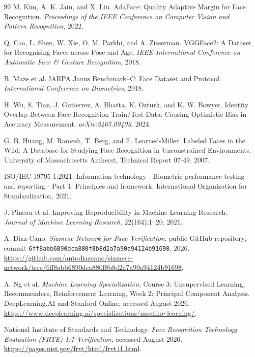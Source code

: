 \documentclass[10pt,a4paper]{article}
\newcommand{\code}[1]{\texttt{#1}}
\begin{document}
\begin{thebibliography}{99}
M. Kim, A. K. Jain, and X. Liu.
AdaFace: Quality Adaptive Margin for Face Recognition.
\emph{Proceedings of the IEEE Conference on Computer Vision and Pattern Recognition}, 2022.

Q. Cao, L. Shen, W. Xie, O. M. Parkhi, and A. Zisserman.
VGGFace2: A Dataset for Recognising Faces across Pose and Age.
\emph{IEEE International Conference on Automatic Face \& Gesture Recognition}, 2018.

B. Maze et al.
IARPA Janus Benchmark--C: Face Dataset and Protocol.
\emph{International Conference on Biometrics}, 2018.

H. Wu, S. Tian, J. Gutierrez, A. Bhatta, K. Ozturk, and K. W. Bowyer.
Identity Overlap Between Face Recognition Train/Test Data: Causing Optimistic Bias in Accuracy Measurement.
\emph{arXiv:2405.09403}, 2024.

G. B. Huang, M. Ramesh, T. Berg, and E. Learned-Miller.
Labeled Faces in the Wild: A Database for Studying Face Recognition in Unconstrained
Environments. University of Massachusetts Amherst, Technical Report 07-49, 2007.

ISO/IEC 19795-1:2021.
Information technology---Biometric performance testing and reporting---Part 1: Principles
and framework. International Organization for Standardization, 2021.

J. Pineau et al.
Improving Reproducibility in Machine Learning Research.
\emph{Journal of Machine Learning Research}, 22(164):1--20, 2021.

A. Diaz-Cano.
\emph{Siamese Network for Face Verification}, public GitHub repository, commit
\code{6ff8abb6890dca880f8b8d2a7a90a94124b91698}, 2026.
\url{https://github.com/antodiazcano/siamese-network/tree/6ff8abb6890dca880f8b8d2a7a90a94124b91698}.

A. Ng et al.
\emph{Machine Learning Specialization}, Course 3: Unsupervised Learning, Recommenders,
Reinforcement Learning, Week 2: Principal Component Analysis. DeepLearning.AI and Stanford
Online, accessed August 2026.
\url{https://www.deeplearning.ai/specializations/machine-learning/}.

National Institute of Standards and Technology.
\emph{Face Recognition Technology Evaluation (FRTE) 1:1 Verification}, accessed August 2026.
\url{https://pages.nist.gov/frvt/html/frvt11.html}.


\end{thebibliography}
\end{document}
